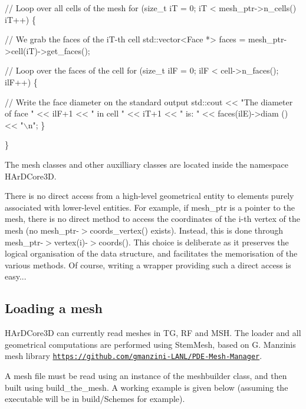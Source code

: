 \begin{DoxyCode}
\textcolor{comment}{// Loop over all cells of the mesh}
\textcolor{keywordflow}{for} (\textcolor{keywordtype}{size\_t} iT = 0; iT < mesh\_ptr->n\_cells() iT++) \{

    \textcolor{comment}{// We grab the faces of the iT-th cell}
    std::vector<Face *> faces = mesh\_ptr->cell(iT)->get\_faces();

    \textcolor{comment}{// Loop over the faces of the cell}
    \textcolor{keywordflow}{for} (\textcolor{keywordtype}{size\_t} ilF = 0; ilF < cell->n\_faces(); ilF++) \{

        \textcolor{comment}{// Write the face diameter on the standard output}
        std::cout << \textcolor{stringliteral}{"The diameter of face "} << ilF+1 << \textcolor{stringliteral}{" in cell "} << iT+1 << \textcolor{stringliteral}{" is: "} << faces(ilE)->diam
      () << \textcolor{stringliteral}{"\(\backslash\)n"};
    \}

\}
\end{DoxyCode}


The mesh classes and other auxilliary classes are located inside the namespace H\+Ar\+D\+Core3D.

There is no direct access from a high-\/level geometrical entity to elements purely associated with lower-\/level entities. For example, if {\ttfamily mesh\+\_\+ptr} is a pointer to the mesh, there is no direct method to access the coordinates of the i-\/th vertex of the mesh (no {\ttfamily mesh\+\_\+ptr-\/$>$coords\+\_\+vertex()} exists). Instead, this is done through {\ttfamily mesh\+\_\+ptr-\/$>$vertex(i)-\/$>$coords()}. This choice is deliberate as it preserves the logical organisation of the data structure, and facilitates the memorisation of the various methods. Of course, writing a wrapper providing such a direct access is easy...\hypertarget{index_loading_mesh}{}\subsection{Loading a mesh}\label{index_loading_mesh}
H\+Ar\+D\+Core3D can currently read meshes in {\ttfamily TG}, {\ttfamily RF} and {\ttfamily M\+SH}. The loader and all geometrical computations are performed using {\ttfamily Stem\+Mesh}, based on G. Manzini\textquotesingle{}s mesh library \href{https://github.com/gmanzini-LANL/PDE-Mesh-Manager}{\tt https\+://github.\+com/gmanzini-\/\+L\+A\+N\+L/\+P\+D\+E-\/\+Mesh-\/\+Manager}.

A mesh file must be read using an instance of the {\ttfamily meshbuilder} class, and then built using {\ttfamily build\+\_\+the\+\_\+mesh}. A working example is given below (assuming the executable will be in {\ttfamily build/\+Schemes} for example).


